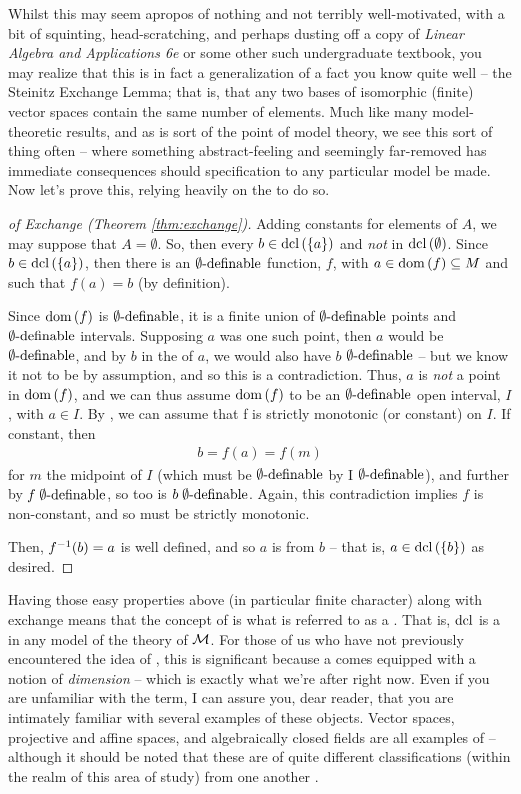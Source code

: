Whilst this may seem apropos of nothing and not terribly well-motivated, with a bit of squinting, head-scratching, and perhaps dusting off a copy of \emph{Linear Algebra and Applications 6e} or some other such undergraduate textbook, you may realize that this is in fact a generalization of a fact you know quite well -- the Steinitz Exchange Lemma; that is, that any two bases of isomorphic (finite) vector spaces contain the same number of elements. Much like many model-theoretic results, and as is sort of the point of model theory, we see this sort of thing often -- where something abstract-feeling and seemingly far-removed has immediate consequences should specification to any particular model be made. Now let's prove this, relying heavily on the \Mt to do so.

\begin{proof}[of Exchange (Theorem \ref{thm:exchange})]
  Adding constants for elements of $A$, we may suppose that $A = \emptyset$. So, then every $b \in \operatorname{dcl}\left(\{a\}\right)$ and \emph{not} in $\operatorname{dcl}\left(\emptyset\right)$. Since $b \in \operatorname{dcl}\left(\{a\}\right)$, then there is an $\mathrel{\emptyset \textrm{-definable}}$ function, $f$, with $a \in \operatorname{dom}\left(f\right) \subseteq M$ and such that $f(a) = b$ (by definition).

  Since $\operatorname{dom}\left(f\right)$ is $\mathrel{\emptyset \textrm{-definable}}$, it is a finite union of $\mathrel{\emptyset \textrm{-definable}}$ points and $\mathrel{\emptyset \textrm{-definable}}$ intervals. Supposing $a$ was one such point, then $a$ would be $\mathrel{\emptyset \textrm{-definable}}$, and by $b$ in the  of $a$, we would also have $b$ $\mathrel{\emptyset \textrm{-definable}}$ -- but we know it not to be by assumption, and so this is a contradiction. Thus, $a$ is \emph{not} a point in $\operatorname{dom}\left(f\right)$, and we can thus assume $\operatorname{dom}\left(f\right)$ to be an $\mathrel{\emptyset \textrm{-definable}}$ open interval, $I$, with $a \in I$. By \Mt, we can assume that f is strictly monotonic (or constant) on $I$. If constant, then
    \begin{align*}
      b = f(a) = f(m)
    \end{align*}
  for $m$ the midpoint of $I$ (which must be $\mathrel{\emptyset \textrm{-definable}}$ by I $\mathrel{\emptyset \textrm{-definable}}$), and further by $f \mathrel{\emptyset \textrm{-definable}}$, so too is $b \mathrel{\emptyset \textrm{-definable}}$. Again, this contradiction implies $f$ is non-constant, and so must be strictly monotonic.

  Then, $f^{-1}(b) = a$ is well defined, and so $a$ is  from $b$ -- that is, $a \in \operatorname{dcl}\left(\{b\}\right)$ as desired.
  \smartqed
\end{proof}

Having those easy properties above (in particular finite character) along with exchange means that the concept of  is what is referred to as a \emph{\pregeom}. That is, $\operatorname{dcl}$ is a \pregeom in any model of the theory of $\mathcal{M}$. For those of us who have not previously encountered the idea of \pregeoms, this is significant because a \pregeom comes equipped with a notion of \emph{dimension} -- which is exactly what we're after right now. Even if you are unfamiliar with the term, I can assure you, dear reader, that you are intimately familiar with several examples of these objects. Vector spaces, projective and affine spaces, and algebraically closed fields are all examples of \pregeoms -- although it should be noted that these are of quite different classifications (within the realm of this area of study) from one another \cite{pillay_geometric_1996}.

